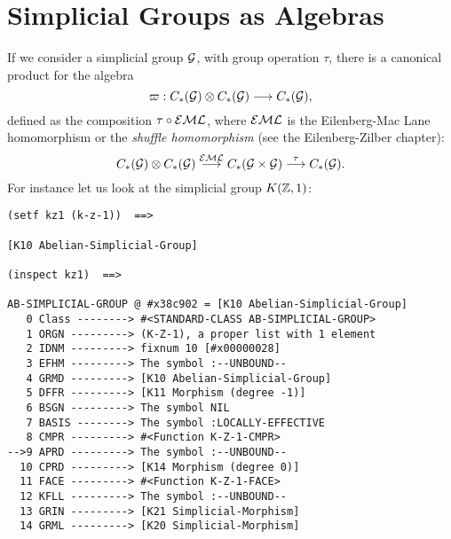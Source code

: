 \section{Simplicial Groups as Algebras}

If we consider a simplicial group ${\cal G}$, with group operation $\tau$, there is a ca\-no\-ni\-cal
product for the algebra
$$\varpi : C_*({\cal G}) \otimes C_*({\cal G}) \longrightarrow C_*({\cal G}), $$
defined as the composition $\tau \circ {\cal EML}$, where ${\cal EML}$ is the 
Eilenberg-Mac Lane homomorphism or the {\em shuffle homomorphism} 
(see the Eilenberg-Zilber chapter):
$$C_*({\cal G}) \otimes C_*({\cal G}) \buildrel {{\cal EML}} \over \longrightarrow 
   C_*({\cal G} \times {\cal G}) \buildrel {\tau} \over \longrightarrow C_*({\cal G}). $$
For instance let us look at the simplicial group $K({{\Bbb Z}}, 1)$:

{\footnotesize\begin{verbatim}
(setf kz1 (k-z-1))  ==>

[K10 Abelian-Simplicial-Group]

(inspect kz1)  ==>
 
AB-SIMPLICIAL-GROUP @ #x38c902 = [K10 Abelian-Simplicial-Group]
   0 Class --------> #<STANDARD-CLASS AB-SIMPLICIAL-GROUP>
   1 ORGN ---------> (K-Z-1), a proper list with 1 element
   2 IDNM ---------> fixnum 10 [#x00000028]
   3 EFHM ---------> The symbol :--UNBOUND--
   4 GRMD ---------> [K10 Abelian-Simplicial-Group]
   5 DFFR ---------> [K11 Morphism (degree -1)]
   6 BSGN ---------> The symbol NIL
   7 BASIS --------> The symbol :LOCALLY-EFFECTIVE
   8 CMPR ---------> #<Function K-Z-1-CMPR>
-->9 APRD ---------> The symbol :--UNBOUND--
  10 CPRD ---------> [K14 Morphism (degree 0)]
  11 FACE ---------> #<Function K-Z-1-FACE>
  12 KFLL ---------> The symbol :--UNBOUND--
  13 GRIN ---------> [K21 Simplicial-Morphism]
  14 GRML ---------> [K20 Simplicial-Morphism]
\end{verbatim}}

